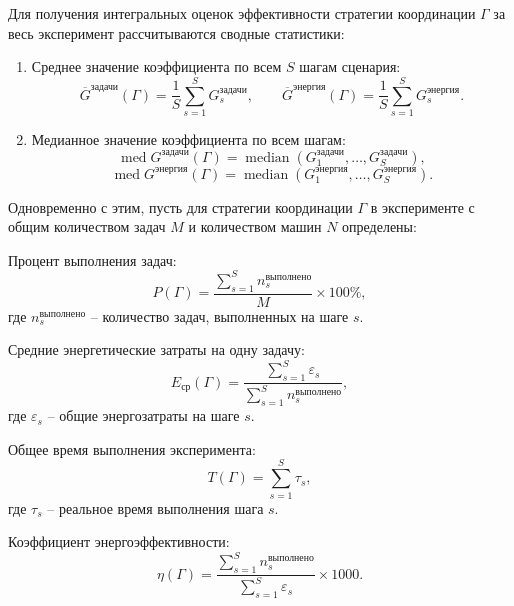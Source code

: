 Для получения интегральных оценок эффективности стратегии координации $\Gamma$ за весь эксперимент рассчитываются сводные статистики:

\begin{enumerate}
	\item Среднее значение коэффициента по всем $S$ шагам сценария:
\begin{equation}
	\overline{G}^{\text{задачи}}(\Gamma) = \frac{1}{S} \sum_{s=1}^{S} G^{\text{задачи}}_s, \qquad
	\overline{G}^{\text{энергия}}(\Gamma) = \frac{1}{S} \sum_{s=1}^{S} G^{\text{энергия}}_s.
\end{equation}

	\item Медианное значение коэффициента по всем шагам:
\begin{equation}
	\operatorname{med} G^{\text{задачи}}(\Gamma) = \operatorname{median}\left( G^{\text{задачи}}_1, \dots, G^{\text{задачи}}_S \right),
\end{equation}
\begin{equation}
	\operatorname{med} G^{\text{энергия}}(\Gamma) = \operatorname{median}\left( G^{\text{энергия}}_1, \dots, G^{\text{энергия}}_S \right).
\end{equation}
\end{enumerate}

Одновременно с этим, пусть для стратегии координации $\Gamma$ в эксперименте с общим количеством задач $M$ и количеством машин $N$ определены:

Процент выполнения задач:
\begin{equation}
	P(\Gamma) = \frac{\displaystyle \sum_{s=1}^{S} n_s^{\text{выполнено}}}{M} \times 100\%,
\end{equation}
где $n_s^{\text{выполнено}}$ -- количество задач, выполненных на шаге $s$.

Средние энергетические затраты на одну задачу:
\begin{equation}
	E_{\text{ср}}(\Gamma) = \frac{\displaystyle \sum_{s=1}^{S} \varepsilon_s}{\displaystyle \sum_{s=1}^{S} n_s^{\text{выполнено}}},
\end{equation}
где $\varepsilon_s$ -- общие энергозатраты на шаге $s$.

Общее время выполнения эксперимента:
\begin{equation}
	T(\Gamma) = \sum_{s=1}^{S} \tau_s,
\end{equation}
где $\tau_s$ -- реальное время выполнения шага $s$.

Коэффициент энергоэффективности:
\begin{equation}
	\eta(\Gamma) = \frac{\displaystyle \sum_{s=1}^{S} n_s^{\text{выполнено}}}{\displaystyle \sum_{s=1}^{S} \varepsilon_s} \times 1000.
\end{equation}

